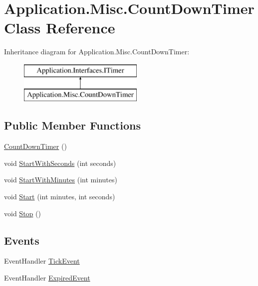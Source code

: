 \hypertarget{class_application_1_1_misc_1_1_count_down_timer}{}\section{Application.\+Misc.\+Count\+Down\+Timer Class Reference}
\label{class_application_1_1_misc_1_1_count_down_timer}
Inheritance diagram for Application.\+Misc.\+Count\+Down\+Timer\+:\begin{figure}[H]
\begin{center}
\leavevmode
\includegraphics[height=2.000000cm]{class_application_1_1_misc_1_1_count_down_timer}
\end{center}
\end{figure}
\subsection*{Public Member Functions}
\begin{DoxyCompactItemize}
\item 
\mbox{\hyperlink{class_application_1_1_misc_1_1_count_down_timer_af178bc6b12712cd232e490c99446837d}{Count\+Down\+Timer}} ()
\item 
void \mbox{\hyperlink{class_application_1_1_misc_1_1_count_down_timer_ad07500432508a81df8f19fc55da7fc27}{Start\+With\+Seconds}} (int seconds)
\item 
void \mbox{\hyperlink{class_application_1_1_misc_1_1_count_down_timer_a46a066ed728519a096d6e47a9df080a3}{Start\+With\+Minutes}} (int minutes)
\item 
void \mbox{\hyperlink{class_application_1_1_misc_1_1_count_down_timer_a287fe196667f4c6aca7fb14506f14916}{Start}} (int minutes, int seconds)
\item 
void \mbox{\hyperlink{class_application_1_1_misc_1_1_count_down_timer_a07b90cc7a451174c7f183127d9965385}{Stop}} ()
\end{DoxyCompactItemize}
\subsection*{Events}
\begin{DoxyCompactItemize}
\item 
Event\+Handler \mbox{\hyperlink{class_application_1_1_misc_1_1_count_down_timer_a8a28f9ffa8a36fc4c71918b554fdb397}{Tick\+Event}}
\item 
Event\+Handler \mbox{\hyperlink{class_application_1_1_misc_1_1_count_down_timer_a6064d64a9bd2b1bb2ae734db384ffb46}{Expired\+Event}}
\end{DoxyCompactItemize}



